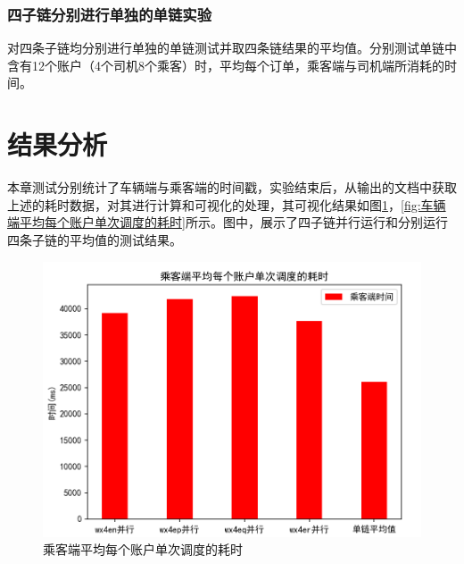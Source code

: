\subsubsection{四子链分别进行单独的单链实验}

对四条子链均分别进行单独的单链测试并取四条链结果的平均值。分别测试单链中含有12个账户（4个司机8个乘客）时，平均每个订单，乘客端与司机端所消耗的时间。

\section{结果分析}

本章测试分别统计了车辆端与乘客端的时间戳，实验结束后，从输出的文档中获取上述的耗时数据，对其进行计算和可视化的处理，其可视化结果如图\ref{fig:乘客端平均每个账户单次调度的耗时}，\ref{fig:车辆端平均每个账户单次调度的耗时}所示。图中，展示了四子链并行运行和分别运行四条子链的平均值的测试结果。

\begin{figure}
	\centering
	\includegraphics[width=\textwidth]{figures/乘客端平均每个账户单次调度的耗时.png}
	\caption{乘客端平均每个账户单次调度的耗时}
	\label{fig:乘客端平均每个账户单次调度的耗时}
\end{figure}

